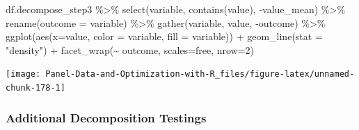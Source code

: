 \documentclass[
]{book}
\newenvironment{Shaded}{\begin{snugshade}}{\end{snugshade}}
\newcommand{\AttributeTok}[1]{\textcolor[rgb]{0.77,0.63,0.00}{#1}}
\newcommand{\DecValTok}[1]{\textcolor[rgb]{0.00,0.00,0.81}{#1}}
\newcommand{\FunctionTok}[1]{\textcolor[rgb]{0.00,0.00,0.00}{#1}}
\newcommand{\NormalTok}[1]{#1}
\newcommand{\SpecialCharTok}[1]{\textcolor[rgb]{0.00,0.00,0.00}{#1}}
\newcommand{\StringTok}[1]{\textcolor[rgb]{0.31,0.60,0.02}{#1}}
\begin{document}
\begin{Shaded}
\begin{Highlighting}[]
\NormalTok{df.decompose\_step3 }\SpecialCharTok{\%\textgreater{}\%}
    \FunctionTok{select}\NormalTok{(variable, }\FunctionTok{contains}\NormalTok{(}\StringTok{\textquotesingle{}value\textquotesingle{}}\NormalTok{), }\SpecialCharTok{{-}}\NormalTok{value\_mean) }\SpecialCharTok{\%\textgreater{}\%}
    \FunctionTok{rename}\NormalTok{(}\AttributeTok{outcome =}\NormalTok{ variable) }\SpecialCharTok{\%\textgreater{}\%}
    \FunctionTok{gather}\NormalTok{(variable, value, }\SpecialCharTok{{-}}\NormalTok{outcome) }\SpecialCharTok{\%\textgreater{}\%}
    \FunctionTok{ggplot}\NormalTok{(}\FunctionTok{aes}\NormalTok{(}\AttributeTok{x=}\NormalTok{value, }\AttributeTok{color =}\NormalTok{ variable, }\AttributeTok{fill =}\NormalTok{ variable)) }\SpecialCharTok{+}
        \FunctionTok{geom\_line}\NormalTok{(}\AttributeTok{stat =} \StringTok{"density"}\NormalTok{) }\SpecialCharTok{+}
        \FunctionTok{facet\_wrap}\NormalTok{(}\SpecialCharTok{\textasciitilde{}}\NormalTok{ outcome, }\AttributeTok{scales=}\StringTok{\textquotesingle{}free\textquotesingle{}}\NormalTok{, }\AttributeTok{nrow=}\DecValTok{2}\NormalTok{)}
\end{Highlighting}
\end{Shaded}

\begin{center}\texttt{[image: Panel-Data-and-Optimization-with-R\_files/figure-latex/unnamed-chunk-178-1]} \end{center}

\hypertarget{additional-decomposition-testings}{%
\subsubsection{Additional Decomposition Testings}\label{additional-decomposition-testings}}
\end{document}
